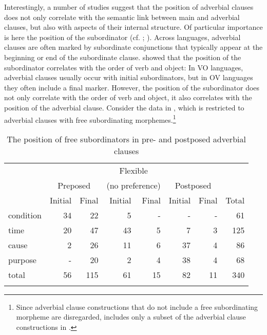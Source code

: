 \documentclass[output=paper]{langsci/langscibook}
\begin{document}
Interestingly, a number of studies suggest that the position of adverbial clauses does not only correlate with the semantic link between main and adverbial clauses, but also with aspects of their internal structure. Of particular importance is here the position of the subordinator (cf. \citealt{Diessel2001}; \citealt{Schmidtke-Bode2009,Hetterle2015}). Across languages, adverbial clauses are often marked by subordinate conjunctions that typically appear at the beginning or end of the subordinate clause. \citet{Dryer1992} showed that the position of the subordinator correlates with the order of verb and object: In VO languages, adverbial clauses usually occur with initial subordinators, but in OV languages they often include a final marker. However, the position of the subordinator does not only correlate with the order of verb and object, it also correlates with the position of the adverbial clause. Consider the data in , which is restricted to adverbial clauses with free subordinating morphemes.\footnote{Since adverbial clause constructions that do not include a free subordinating morpheme are disregarded,  includes only a subset of the adverbial clause constructions in .} 

\begin{table}
\begin{tabularx}{\textwidth}{X rr  rr rr  r}
\lsptoprule
& & & \multicolumn{2}{c}{Flexible}\\
& \multicolumn{2}{c}{Preposed} &  \multicolumn{2}{c}{(no preference)} &  \multicolumn{2}{c}{Postposed} \\
\cmidrule(lr){2-3}\cmidrule(lr){4-5}\cmidrule(lr){6-7}
&   Initial &   Final &   Initial &   Final &   Initial &   Final & Total\\
\midrule
{condition} 	& 34 	& 22 	& 5 	& - 	& - 	& - 	& 61\\
{time} 		& 20 	& 47 	& 43 	& 5 	& 7 	& 3 	& 125\\
{cause} 	& 2 	& 26 	& 11 	& 6 	& 37 	& 4 	& 86\\
{purpose} 	& - 	& 20 	& 2 	& 4 	& 38 	& 4 	& 68\\
\midrule
{total} 	& 56 	& 115 	& 61 	& 15 	& 82 	& 11 	& 340\\
\lspbottomrule
\end{tabularx}

\caption{The position of free subordinators in pre- and postposed adverbial clauses}
\label{tab:diessel:3}
\end{table}
\end{document}
